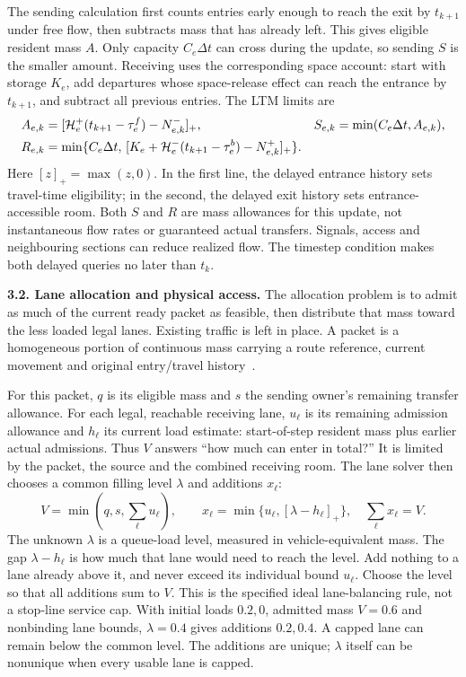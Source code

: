 \documentclass[10pt,a4paper]{article}
\newcommand{\pos}[1]{[#1]_+}
\begin{document}
The sending calculation first counts entries early enough to reach the
exit by $t_{k+1}$ under free flow, then subtracts mass that has already
left. This gives eligible resident mass $A$. Only capacity $C_e\Delta t$
can cross during the update, so sending $S$ is the smaller amount.
Receiving uses the corresponding space account: start with storage
$K_e$, add departures whose space-release effect can reach the entrance
by $t_{k+1}$, and subtract all previous entries. The LTM limits are~\cite{m0}
\begin{align}
 A_{e,k}&=\pos{{\cal H}^+_e(t_{k+1}-\tau^f_e)-N^-_{e,k}},
 &S_{e,k}&=\min(C_e\Delta t,A_{e,k}),\label{eq:compact-sending}\\
 R_{e,k}&=\min\{C_e\Delta t,\,
 \pos{K_e+{\cal H}^-_e(t_{k+1}-\tau^b_e)-N^+_{e,k}}\}.
 \label{eq:compact-receiving}
\end{align}
Here $[z]_+=\max(z,0)$. In the first line, the delayed entrance history
sets travel-time eligibility; in the second, the delayed exit history
sets entrance-accessible room. Both $S$ and $R$ are mass allowances for
this update, not instantaneous flow rates or guaranteed actual transfers.
Signals, access and neighbouring sections can reduce realized flow.
The timestep condition makes both delayed queries no later than $t_k$.

\textbf{3.2. Lane allocation and physical access.}
The allocation problem is to admit as much of the current ready packet
as feasible, then distribute that mass toward the less loaded legal lanes.
Existing traffic is left in place. A packet is a homogeneous portion of
continuous mass carrying a route reference, current movement and original
entry/travel history~\cite{m1}.

For this packet, $q$ is its eligible mass and $s$ the sending owner's
remaining transfer allowance. For each legal, reachable receiving lane,
$u_\ell$ is its remaining admission allowance and $h_\ell$ its current
load estimate: start-of-step resident mass plus earlier actual admissions.
Thus $V$ answers ``how much can enter in total?'' It is limited by the
packet, the source and the combined receiving room. The lane solver then
chooses a common filling level $\lambda$ and additions $x_\ell$:
\begin{equation}
 V=\min(q,s,\sum_\ell u_\ell),\qquad
 x_\ell=\min\{u_\ell,[\lambda-h_\ell]_+\},\quad
 \sum_\ell x_\ell=V .
 \label{eq:compact-allocation}
\end{equation}
The unknown $\lambda$ is a queue-load level, measured in vehicle-equivalent
mass. The gap $\lambda-h_\ell$ is how much that lane would need to reach
the level. Add nothing to a lane already above it, and never exceed its
individual bound $u_\ell$. Choose the level so that all additions sum to
$V$. This is the specified ideal lane-balancing rule, not a stop-line
service cap. With initial loads $0.2,0$, admitted mass $V=0.6$ and
nonbinding lane bounds, $\lambda=0.4$ gives additions $0.2,0.4$.
A capped lane can remain below the common level. The additions are unique;
$\lambda$ itself can be nonunique when every usable lane is capped.
\end{document}

